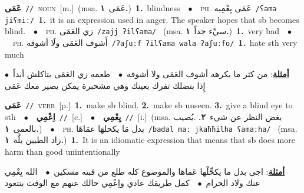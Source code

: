 \documentclass[10pt,a4paper,twoside]{article} %
\begin{document}
\begin{multicols}{2}
{\setlength\topsep{0pt}\textbf{\foreignlanguage{arabic}{عَمَى}}\ {\color{gray}\texttt{//}\color{black}}\ \textsc{noun}\ [m.]\ \color{gray}(msa. \foreignlanguage{arabic}{عَمَى}~\foreignlanguage{arabic}{\textbf{١.}})\color{black}\ \textbf{1.}~blindness\ \ $\bullet$\ \ \textsc{ph.} \color{gray} \foreignlanguage{arabic}{عَمَى يِعْمِيه}\color{black}\ {\color{gray}\texttt{/{\sffamily ʕama jiʕmiː}/}\color{black}}\ \textbf{1.}~it is an expression used in anger. The speaker hopes that sb becomes blind.\ \ $\bullet$\ \ \textsc{ph.} \color{gray} \foreignlanguage{arabic}{زي العَمَى}\color{black}\ {\color{gray}\texttt{/{\sffamily zajj ʔilʕama}/}\color{black}}\ \color{gray} (msa. \foreignlanguage{arabic}{سيِّء جداً}~\foreignlanguage{arabic}{\textbf{١.}})\color{black}\ \textbf{1.}~very bad\ \ $\bullet$\ \ \textsc{ph.} \color{gray} \foreignlanguage{arabic}{أَشوف العَمَى ولَا أشوفه}\color{black}\ {\color{gray}\texttt{/{\sffamily ʔaʃuːf ʔilʕama wala ʔaʃuːfo}/}\color{black}}\ \textbf{1.}~hate sth very much\  \begin{flushright}\color{gray}\foreignlanguage{arabic}{\textbf{\underline{\foreignlanguage{arabic}{أمثلة}}}: من كثر ما بكرهه أشوف العَمَى ولا أشوفه\ $\bullet$\ \  طعمه زي العَمَى بتاكلش أبداً\ $\bullet$\ \  إِذا بتضلك تفرك بعينك وهي مشحبرة يمكن يصير معك عَمَى}\end{flushright}\color{black}} \vspace{2mm}

{\setlength\topsep{0pt}\textbf{\foreignlanguage{arabic}{عَمَى}}\ {\color{gray}\texttt{//}\color{black}}\ \textsc{verb}\ [p.]\ \textbf{1.}~make sb blind.  \textbf{2.}~make sb unseen.  \textbf{3.}~give a blind eye to sth\ \ $\bullet$\ \ \setlength\topsep{0pt}\textbf{\foreignlanguage{arabic}{اِعْمِي}}\ {\color{gray}\texttt{//}\color{black}}\ [c.]\ \ $\bullet$\ \ \setlength\topsep{0pt}\textbf{\foreignlanguage{arabic}{يِعْمِي}}\ {\color{gray}\texttt{//}\color{black}}\ [i.]\ \color{gray}(msa. \foreignlanguage{arabic}{يغض النظر عن شيء}~\foreignlanguage{arabic}{\textbf{٢.}}  .\foreignlanguage{arabic}{يُصيب بالعمى}~\foreignlanguage{arabic}{\textbf{١.}})\color{black}\ \ $\bullet$\ \ \textsc{ph.} \color{gray} \foreignlanguage{arabic}{بدل مَا يكحلهَا عمَاهَا}\color{black}\ {\color{gray}\texttt{/{\sffamily badal maː jkaħħilha ʕamaːha}/}\color{black}}\ \color{gray} (msa. \foreignlanguage{arabic}{زاد الطيين بلَّة}~\foreignlanguage{arabic}{\textbf{١.}})\color{black}\ \textbf{1.}~It is an idiomatic expression that means that sb does more harm than good unintentionally\  \begin{flushright}\color{gray}\foreignlanguage{arabic}{\textbf{\underline{\foreignlanguage{arabic}{أمثلة}}}: اجى بدل ما يكحِّلْها عَماها والموضوع كله طلع من قبته مسكين\ $\bullet$\ \  الله يِعْمِي عنك ولاد الحرام\ $\bullet$\ \  كمل طريقك عادي واِعْمِي حالك عنهم مع الوقت بتتعود}\end{flushright}\color{black}} \vspace{2mm}


\end{multicols}
\end{document}
